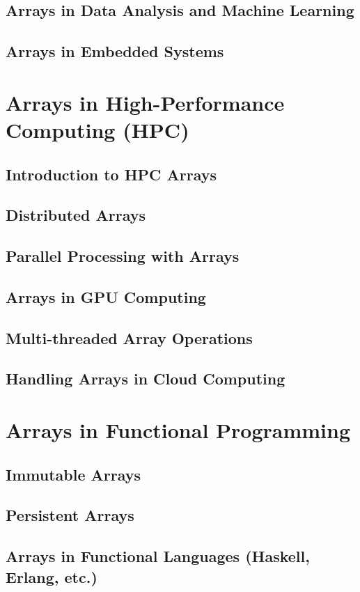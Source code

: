 \documentclass[12pt, oneside]{book}
\begin{document}
	\section{Arrays in Data Analysis and Machine Learning}
	\section{Arrays in Embedded Systems}
	
	\chapter{Arrays in High-Performance Computing (HPC)}
	\section{Introduction to HPC Arrays}
	\section{Distributed Arrays}
	\section{Parallel Processing with Arrays}
	\section{Arrays in GPU Computing}
	\section{Multi-threaded Array Operations}
	\section{Handling Arrays in Cloud Computing}
	
	\chapter{Arrays in Functional Programming}
	\section{Immutable Arrays}
	\section{Persistent Arrays}
	\section{Arrays in Functional Languages (Haskell, Erlang, etc.)}
\end{document}
